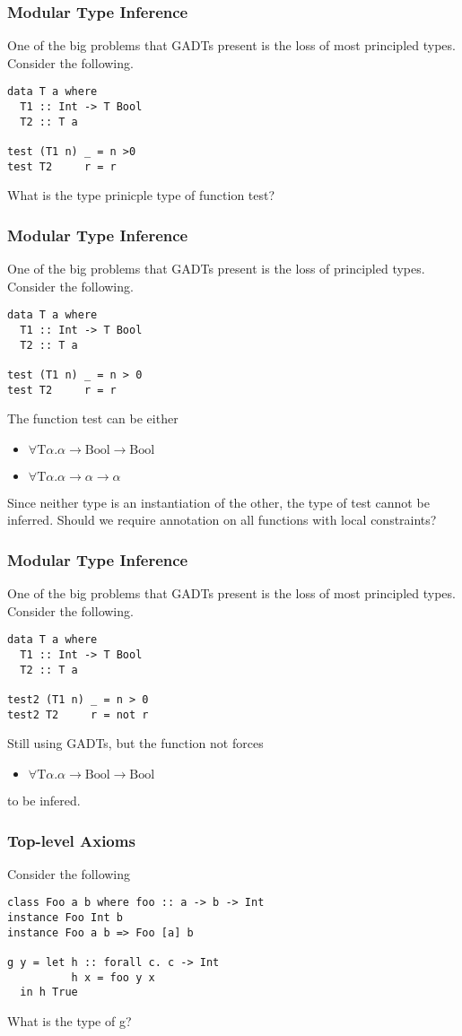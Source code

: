 \documentclass{beamer}
\begin{document}
\begin{frame}[fragile]
\frametitle{Modular Type Inference}
One of the big problems that GADTs present is the loss of most principled types. Consider the following.
\begin{lstlisting}
data T a where
  T1 :: Int -> T Bool
  T2 :: T a

test (T1 n) _ = n >0
test T2     r = r
\end{lstlisting}
What is the type prinicple type of function test?
\end{frame}

\begin{frame}[fragile]
\frametitle{Modular Type Inference}
One of the big problems that GADTs present is the loss of principled types. Consider the following.
\begin{lstlisting}
data T a where
  T1 :: Int -> T Bool
  T2 :: T a

test (T1 n) _ = n > 0
test T2     r = r
\end{lstlisting}
The function test can be either
\begin{itemize}
\item $\forall \mbox{T} \alpha.\alpha \rightarrow \mbox{Bool} \rightarrow \mbox{Bool}$
\item $\forall \mbox{T} \alpha.\alpha \rightarrow \alpha \rightarrow \alpha$
\end{itemize}
Since neither type is an instantiation of the other, the type of test cannot be inferred. Should we require annotation on all functions with local constraints?
\end{frame}

\begin{frame}[fragile]
\frametitle{Modular Type Inference}
One of the big problems that GADTs present is the loss of most principled types. Consider the following.
\begin{lstlisting}
data T a where
  T1 :: Int -> T Bool
  T2 :: T a

test2 (T1 n) _ = n > 0
test2 T2     r = not r
\end{lstlisting}
Still using GADTs, but the function not forces
\begin{itemize}
\item $\forall \mbox{T} \alpha.\alpha \rightarrow \mbox{Bool} \rightarrow \mbox{Bool}$
\end{itemize}
to be infered.
\end{frame}


\begin{frame}[fragile]
\frametitle{Top-level Axioms}
Consider the following
\begin{lstlisting}
class Foo a b where foo :: a -> b -> Int
instance Foo Int b
instance Foo a b => Foo [a] b

g y = let h :: forall c. c -> Int
          h x = foo y x
  in h True
\end{lstlisting}
What is the type of g?
\end{frame}
\end{document}

